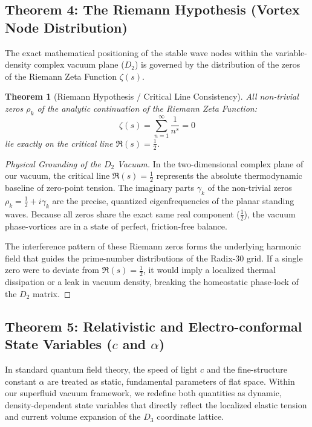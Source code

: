 \documentclass[11pt,a4paper]{article}
\theoremstyle{plain}
\newtheorem{theorem}{Theorem}[section] %
\theoremstyle{definition}
\theoremstyle{remark}
\begin{document}
\subsection{Theorem 4: The Riemann Hypothesis (Vortex Node Distribution)}
The exact mathematical positioning of the stable wave nodes within the variable-density complex vacuum plane ($D_2$) is governed by the distribution of the zeros of the Riemann Zeta Function $\zeta(s)$.

\begin{theorem}[Riemann Hypothesis / Critical Line Consistency]
All non-trivial zeros $\rho_k$ of the analytic continuation of the Riemann Zeta Function:
\begin{equation}
\zeta(s) = \sum_{n=1}^{\infty} \frac{1}{n^s} = 0
\end{equation}
lie exactly on the critical line $\mathfrak{R}(s) = \frac{1}{2}$.
\end{theorem}

\begin{proof}[Physical Grounding of the $D_2$ Vacuum]
In the two-dimensional complex plane of our vacuum, the critical line $\mathfrak{R}(s) = \frac{1}{2}$ represents the absolute thermodynamic baseline of zero-point tension. The imaginary parts $\gamma_k$ of the non-trivial zeros $\rho_k = \frac{1}{2} + i\gamma_k$ are the precise, quantized eigenfrequencies of the planar standing waves. Because all zeros share the exact same real component ($\frac{1}{2}$), the vacuum phase-vortices are in a state of perfect, friction-free balance. 

The interference pattern of these Riemann zeros forms the underlying harmonic field that guides the prime-number distributions of the Radix-30 grid. If a single zero were to deviate from $\mathfrak{R}(s) = \frac{1}{2}$, it would imply a localized thermal dissipation or a leak in vacuum density, breaking the homeostatic phase-lock of the $D_2$ matrix.
\end{proof}

\subsection{Theorem 5: Relativistic and Electro-conformal State Variables ($c$ and $\alpha$)}
In standard quantum field theory, the speed of light $c$ and the fine-structure constant $\alpha$ are treated as static, fundamental parameters of flat space. Within our superfluid vacuum framework, we redefine both quantities as dynamic, density-dependent state variables that directly reflect the localized elastic tension and current volume expansion of the $D_3$ coordinate lattice.
\end{document}

